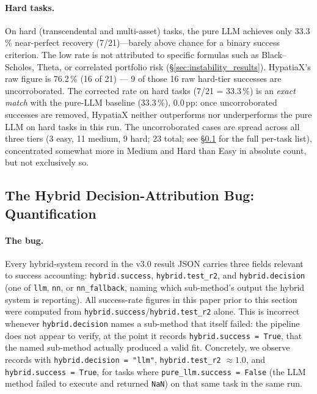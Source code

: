 \documentclass[twoside,11pt]{article}
\begin{document}
\paragraph{Hard tasks.}
On hard (transcendental and multi-asset) tasks, the pure LLM achieves only 33.3\,\%
near-perfect recovery (7/21)---barely above chance for a binary success criterion. The
low rate is not attributed to specific formulas such as
Black--Scholes, Theta, or correlated portfolio risk (\S\ref{sec:instability_results}). HypatiaX's raw figure is 76.2\,\%
(16 of 21) --- 9 of those 16 raw hard-tier successes are uncorroborated. The corrected rate on hard
tasks (7/21 = 33.3\,\%) is an \emph{exact match} with the pure-LLM baseline
(33.3\,\%), $0.0$\,pp: once uncorroborated successes are removed, HypatiaX neither outperforms nor
underperforms the pure LLM on hard tasks in this run.
The uncorroborated cases are spread across all three tiers (3 easy, 11 medium, 9 hard;
23 total; see \S\ref{sec:hybrid-attribution-bug} for the full per-task list),
concentrated somewhat more in Medium and Hard than Easy in absolute count, but
not exclusively so.

\subsection{The Hybrid Decision-Attribution Bug: Quantification}
\label{sec:hybrid-attribution-bug}

\paragraph{The bug.} Every hybrid-system record in the v3.0 result JSON carries
three fields relevant to success accounting: \texttt{hybrid.success},
\texttt{hybrid.test\_r2}, and \texttt{hybrid.decision} (one of \texttt{llm},
\texttt{nn}, or \texttt{nn\_fallback}, naming which sub-method's output the
hybrid system is reporting). All success-rate figures in this paper prior to
this section were computed from \texttt{hybrid.success}/\texttt{hybrid.test\_r2}
alone. This is incorrect whenever \texttt{hybrid.decision} names a sub-method
that itself failed: the pipeline does not appear to verify, at the point it
records \texttt{hybrid.success = True}, that the named sub-method actually
produced a valid fit. Concretely, we observe records with
\texttt{hybrid.decision = "llm"}, \texttt{hybrid.test\_r2} $\approx 1.0$, and
\texttt{hybrid.success = True}, for tasks where \texttt{pure\_llm.success =
False} (the LLM method failed to execute and returned \texttt{NaN}) on that
same task in the same run.
\end{document}
